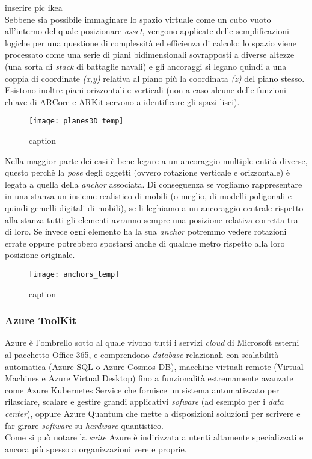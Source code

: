 \todo{} inserire pic ikea\\

Sebbene sia possibile immaginare lo spazio virtuale come un cubo vuoto all'interno del quale posizionare \textit{asset}, vengono applicate delle semplificazioni logiche per una questione di complessità ed efficienza di calcolo: lo spazio viene processato come una serie di piani bidimensionali sovrapposti a diverse altezze (una sorta di \textit{stack} di battaglie navali) e gli ancoraggi si legano quindi a una coppia di coordinate \textit{(x,y)} relativa al piano più la coordinata \textit{(z)} del piano stesso. Esistono inoltre piani orizzontali e verticali (non a caso alcune delle funzioni chiave di ARCore e ARKit servono a identificare gli spazi lisci).

\begin{figure}[H]
  \centering
  \texttt{[image: planes3D\_temp]}
  \caption[Piani in realtà aumentata]{caption \todo}
\end{figure}

Nella maggior parte dei casi è bene legare a un ancoraggio multiple entità diverse, questo perchè la \textit{pose} degli oggetti (ovvero rotazione verticale e orizzontale) è legata a quella della \textit{anchor} associata. Di conseguenza se vogliamo rappresentare in una stanza un insieme realistico di mobili (o meglio, di modelli poligonali e quindi gemelli digitali di mobili), se li leghiamo a un ancoraggio centrale rispetto alla stanza tutti gli elementi avranno sempre una posizione relativa corretta tra di loro. Se invece ogni elemento ha la sua \textit{anchor} potremmo vedere rotazioni errate oppure potrebbero spostarsi anche di qualche metro rispetto alla loro posizione originale.

\begin{figure}[H]
  \centering
  \texttt{[image: anchors\_temp]}
  \caption[Ancoraggi singoli per multipli elementi]{caption \todo}
\end{figure}

\subsubsection{Azure ToolKit}
Azure è l'ombrello sotto al quale vivono tutti i servizi \textit{cloud} di Microsoft esterni al pacchetto Office 365, e comprendono \textit{database} relazionali con scalabilità automatica (Azure SQL o Azure Cosmos DB), macchine virtuali remote (Virtual Machines e Azure Virtual Desktop) fino a funzionalità estremamente avanzate come Azure Kubernetes Service che fornisce un sistema automatizzato per rilasciare, scalare e gestire grandi applicativi \textit{sofware} (ad esempio per i \textit{data center}), oppure Azure Quantum che mette a disposizioni soluzioni per scrivere e far girare \textit{software} su \textit{hardware} quantistico.\\
Come si può notare la \textit{suite} Azure è indirizzata a utenti altamente specializzati e ancora più spesso a organizzazioni vere e proprie.

